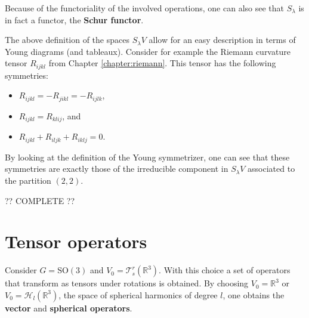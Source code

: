     Because of the functoriality of the involved operations, one can also see that $S_\lambda$ is in fact a functor, the \textbf{Schur functor}.

    \begin{example}
        The above definition of the spaces $S_\lambda V$ allow for an easy description in terms of Young diagrams (and tableaux). Consider for example the Riemann curvature tensor $R_{ijkl}$ from Chapter \ref{chapter:riemann}. This tensor has the following symmetries:
        \begin{itemize}
            \item $R_{ijkl} = -R_{jikl} = -R_{ijlk}$,
            \item $R_{ijkl} = R_{klij}$, and
            \item $R_{ijkl} + R_{iljk} + R_{iklj} = 0$.
        \end{itemize}
        By looking at the definition of the Young symmetrizer, one can see that these symmetries are exactly those of the irreducible component in $S_\lambda V$ associated to the partition $(2,2)$.

        ?? COMPLETE ??
    \end{example}

\section{Tensor operators}

    \begin{example}
        Consider $G=\text{SO}(3)$ and $V_0=\mathcal{T}^r_s(\mathbb{R}^3)$. With this choice a set of operators that transform as tensors under rotations is obtained. By choosing $V_0=\mathbb{R}^3$ or $V_0=\mathcal{H}_l(\mathbb{R}^3)$, the space of spherical harmonics of degree $l$, one obtains the \textbf{vector} and \textbf{spherical operators}.
    \end{example}

